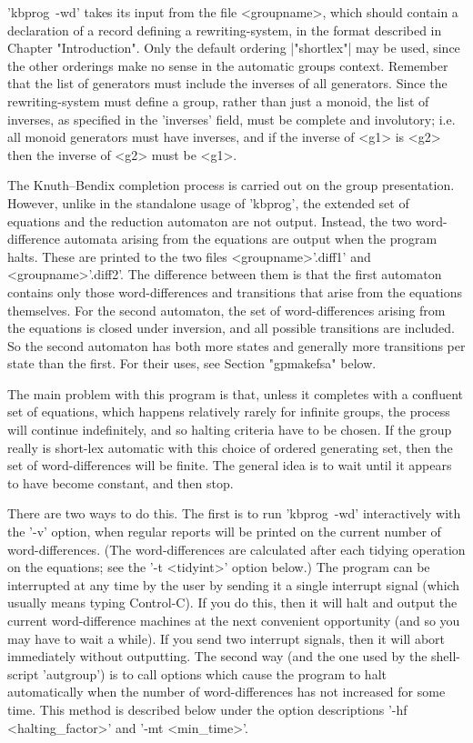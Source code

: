 'kbprog\ -wd' takes its input from the file <groupname>, which should contain a
declaration of a record defining a rewriting-system, in the format described
in Chapter "Introduction". Only the default ordering |"shortlex"| may be used,
since the other orderings make no sense in the automatic groups context.
Remember that the list of generators must include the inverses of all
generators.  Since the rewriting-system must define a group, rather than just
a monoid, the list of inverses, as specified in the 'inverses' field, must be
complete and involutory; i.e. all monoid generators must have inverses, and if
the inverse of <g1> is <g2> then the inverse of <g2> must be <g1>.

The Knuth--Bendix completion process is carried out on the group presentation.
However, unlike in the standalone usage of 'kbprog', the extended set of
equations and the reduction automaton are not output. Instead, the two
word-difference automata arising from the equations are output when the program
halts. These are printed to the two files <groupname>'.diff1' and
<groupname>'.diff2'. The difference between them is that the first automaton
contains only those word-differences and transitions that arise from the
equations themselves. For the second automaton, the set of word-differences
arising from the equations is closed under inversion, and all possible
transitions are included. So the second automaton has both more states and
generally more transitions per state than the first. For their uses, see
Section "gpmakefsa" below.

The main problem with this program is that, unless it completes with a
confluent set of equations, which happens relatively rarely for infinite groups,
the process will continue indefinitely, and so halting criteria have to be
chosen. If the group really is short-lex automatic with this choice of
ordered generating set, then the set of word-differences will be finite.
The general idea is to wait until it appears to have become constant, and
then stop.

There are two ways to do this. The first is to run 'kbprog\ -wd'
interactively with the '-v' option, when regular reports will be printed
on the current number of word-differences. (The word-differences are
calculated after each tidying operation on the equations; see the
'-t <tidyint>' option below.) The program can be interrupted at any time by the
user by sending it a single interrupt signal (which usually means typing
Control-C).  If you do this, then it will halt and output the current 
word-difference machines at the next convenient
opportunity (and so you may have to wait a while). If you send two interrupt
signals, then it will abort immediately without outputting.
The second way (and the one used by the shell-script 'autgroup') is to call
options which cause the program to halt automatically when the number of
word-differences has not increased for some time. This method is described
below under the option descriptions  '-hf <halting\_factor>' and
'-mt <min\_time>'.

